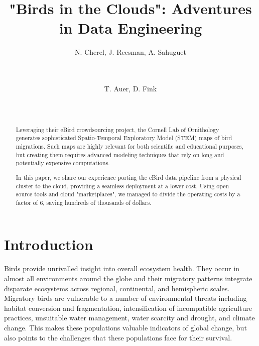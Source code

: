 \documentclass{acm_proc_article-sp}
\begin{document}

\title{"Birds in the Clouds": Adventures in Data Engineering}



\author{
\alignauthor
N. Cherel, J. Reesman, A. Sahuguet\\
       \\
       \\
\and
T. Auer,  D. Fink\\
       \\
       \\
}

\maketitle \begin{abstract}
Leveraging their eBird crowdsourcing project, the Cornell Lab of Ornithology generates sophisticated Spatio-Temporal Exploratory Model (STEM) maps of bird migrations. Such maps are highly relevant for both scientific and educational purposes, but creating them requires advanced modeling techniques that rely on long and potentially expensive computations.
    
In this paper, we share our experience porting the eBird data pipeline from a physical cluster to the cloud, providing a seamless deployment at a lower cost. Using open source tools and cloud "marketplaces", we managed to divide the operating costs by a factor of 6, saving  hundreds of thousands of dollars.
\end{abstract}

\section{Introduction}
Birds provide unrivalled insight into overall ecosystem health. They occur in almost all environments around the globe and their migratory patterns integrate disparate ecosystems across regional, continental, and hemispheric scales. Migratory birds are vulnerable to a number of environmental threats including habitat conversion and fragmentation, intensification of incompatible agriculture practices, unsuitable water management, water scarcity and drought, and climate change. This makes these populations valuable indicators of global change, but also points to the challenges that these populations face for their survival.
\end{document}
